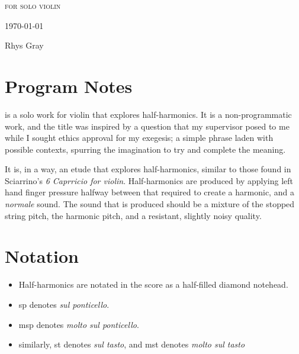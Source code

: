 \newpage

\invisiblechapter{\violinPiece}

\vspace{3.8cm}

\begin{center}

\textsc{for solo violin}

\vspace{2.8cm}

\HRule{0.5pt}

\LARGE \textbf{\uppercase{\violinPiece}}

\HRule{2pt}

\vspace{1.8cm}

\normalsize \today

\vspace{3.8cm}

Rhys Gray

\end{center}
\newpage
\section*{Program Notes}
\violinPiece is a solo work for violin that explores half-harmonics.
It is a non-programmatic work, and the title was inspired by a question that my supervisor posed to me while I sought ethics approval for my exegesis; a simple phrase laden with possible contexts, spurring the imagination to try and complete the meaning.

It is, in a way, an etude that explores half-harmonics, similar to those found in Sciarrino's \emph{6 Caprricio for violin}. 
Half-harmonics are produced by applying left hand finger pressure halfway between that required to create a harmonic, and a \emph{normale} sound. 
The sound that is produced should be a mixture of the stopped string pitch, the harmonic pitch, and a resistant, slightly noisy quality.

\section*{Notation}
\begin{itemize}

    \item Half-harmonics are notated in the score as a half-filled diamond notehead.
    \item sp denotes \emph{sul ponticello}.
    \item msp denotes \emph{molto sul ponticello}.
    \item similarly, st denotes \emph{sul tasto}, and mst denotes \emph{molto sul tasto}
\end{itemize}

\newpage

% 


